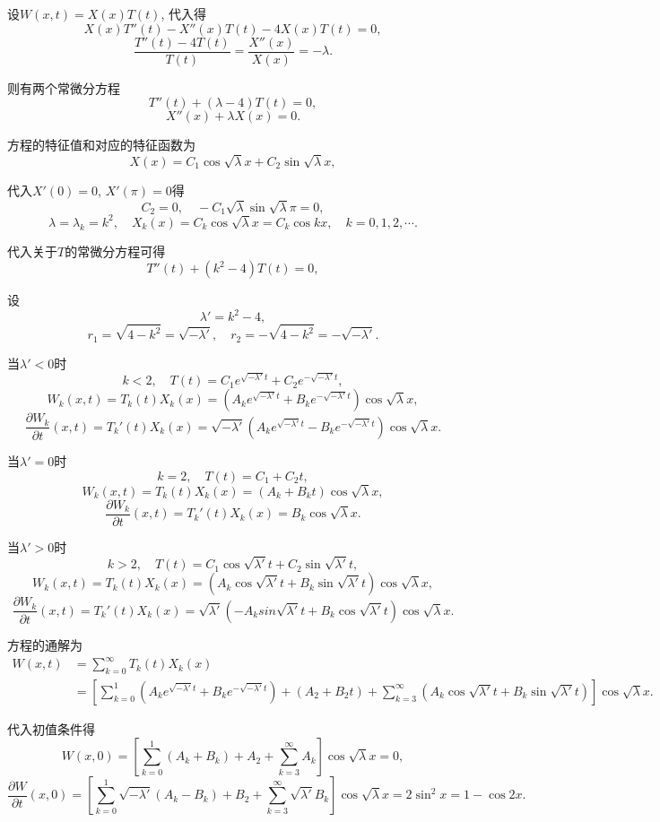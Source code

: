\documentclass[11pt,a4paper]{article}
\begin{document}
设$W(x,t)=X(x)T(t)$, 代入得
$$X(x)T''(t)-X''(x)T(t)-4X(x)T(t)=0,$$
$$\frac{T''(t)-4T(t)}{T(t)}=\frac{X''(x)}{X(x)}=-\lambda.$$

则有两个常微分方程
$$T''(t)+(\lambda-4)T(t)=0,$$
$$X''(x)+\lambda X(x)=0.$$

方程的特征值和对应的特征函数为
$$X(x)=C_1\cos\sqrt{\lambda}x+C_2\sin\sqrt{\lambda}x,$$

代入$X'(0)=0$, $X'(\pi)=0$得
$$C_2=0,\quad -C_1\sqrt{\lambda}\sin\sqrt{\lambda}\pi=0,$$
$$\lambda=\lambda_k=k^2,\quad X_k(x)=C_k\cos\sqrt{\lambda}x=C_k\cos kx,\quad k=0,1,2,\cdots.$$

代入关于$T$的常微分方程可得
$$T''(t)+(k^2-4)T(t)=0,$$

设$$\lambda'=k^2-4,$$
$$r_1=\sqrt{4-k^2}=\sqrt{-\lambda'},\quad r_2=-\sqrt{4-k^2}=-\sqrt{-\lambda'}.$$

当$\lambda'<0$时
$$k<2,\quad T(t)=C_1e^{\sqrt{-\lambda'}t}+C_2e^{-\sqrt{-\lambda'}t},$$
$$W_k(x,t)=T_k(t)X_k(x)=(A_ke^{\sqrt{-\lambda'}t}+B_ke^{-\sqrt{-\lambda'}t})\cos\sqrt{\lambda}x,$$
$$\frac{\partial W_k}{\partial t}(x,t)=T_k'(t)X_k(x)=\sqrt{-\lambda'}(A_ke^{\sqrt{-\lambda'}t}-B_ke^{-\sqrt{-\lambda'}t})\cos\sqrt{\lambda}x.$$

当$\lambda'=0$时
$$k=2,\quad T(t)=C_1+C_2t,$$
$$W_k(x,t)=T_k(t)X_k(x)=(A_k+B_kt)\cos\sqrt{\lambda}x,$$
$$\frac{\partial W_k}{\partial t}(x,t)=T_k'(t)X_k(x)=B_k\cos\sqrt{\lambda}x.$$

当$\lambda'>0$时
$$k>2,\quad T(t)=C_1\cos\sqrt{\lambda'}t+C_2\sin\sqrt{\lambda'}t,$$
$$W_k(x,t)=T_k(t)X_k(x)=(A_k\cos\sqrt{\lambda'}t+B_k\sin\sqrt{\lambda'}t)\cos\sqrt{\lambda}x,$$
$$\frac{\partial W_k}{\partial t}(x,t)=T_k'(t)X_k(x)=\sqrt{\lambda'}(-A_ksin\sqrt{\lambda'}t+B_k\cos\sqrt{\lambda'}t)\cos\sqrt{\lambda}x.$$

方程的通解为
\begin{align*}
  W(x,t)
   & =\sum_{k=0}^\infty T_k(t)X_k(x)              \\
   & =\left[\sum_{k=0}^1(A_ke^{\sqrt{-\lambda'}t}
  +B_ke^{-\sqrt{-\lambda'}t})+(A_2+B_2t)
  +\sum_{k=3}^\infty(A_k\cos\sqrt{\lambda'}t
  +B_k\sin\sqrt{\lambda'}t)\right]\cos\sqrt{\lambda}x.
\end{align*}

代入初值条件得
$$W(x,0)=\left[\sum_{k=0}^1(A_k+B_k)+A_2+\sum_{k=3}^\infty A_k\right]\cos\sqrt{\lambda}x=0,$$
$$\frac{\partial W}{\partial t}(x,0)=\left[\sum_{k=0}^1\sqrt{-\lambda'}(A_k-B_k)+B_2+\sum_{k=3}^\infty\sqrt{\lambda'}B_k\right]\cos\sqrt{\lambda}x=2\sin^2x=1-\cos2x.$$
\end{document}
